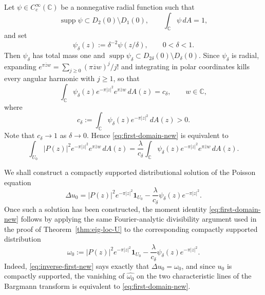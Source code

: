 \documentclass[a4paper,11pt,reqno]{amsart}
\numberwithin{equation}{section}
\theoremstyle{plain} %
\theoremstyle{definition} %
\theoremstyle{remark}
\DeclareMathOperator{\supp}{supp}
\newcommand{\C}{\mathbb{C}}
\begin{document}
Let $\psi\in C_c^\infty(\C)$ be a nonnegative radial function such that
\[
\supp \psi \subset D_2(0)\setminus D_1(0),
\qquad
\int_\C \psi\,dA=1,
\]
and set
\[
\psi_\delta(z):=\delta^{-2}\psi(z/\delta),\qquad 0<\delta<1.
\]
Then $\psi_\delta$ has total mass one and $\supp\psi_\delta\subset D_{2\delta}(0)\setminus D_\delta(0)$. Since $\psi_\delta$ is radial, expanding $e^{\pi\overline z w}=\sum_{j\ge 0}(\pi\overline z w)^j/j!$ and integrating in polar coordinates kills every angular harmonic with $j\ge 1$, so that
\[
\int_{\C} \psi_\delta(z)e^{-\pi|z|^2}e^{\pi \overline z w}\,dA(z)=c_\delta,
\qquad w\in\C,
\]
where
\[
c_\delta:=\int_{\C}\psi_\delta(z)e^{-\pi|z|^2}\,dA(z)>0.
\]
Note that $c_\delta\to 1$ as $\delta\to 0$. Hence \eqref{eq:first-domain-new} is equivalent to
\begin{equation}\label{eq:second-domain-new}
\int_{U_0} |P(z)|^2 e^{-\pi|z|^2} e^{\pi \overline z w}\,dA(z)
=
\frac{\lambda}{c_\delta}
\int_{\C}\psi_\delta(z)e^{-\pi|z|^2}e^{\pi \overline z w}\,dA(z).
\end{equation}

We shall construct a compactly supported distributional solution of the Poisson equation
\begin{equation}\label{eq:inverse-first-new}
\Delta u_0
=
|P(z)|^2 e^{-\pi|z|^2}\mathbf{1}_{U_0}
-\frac{\lambda}{c_\delta}\psi_\delta(z)e^{-\pi|z|^2}.
\end{equation}
Once such a solution has been constructed, the moment identity \eqref{eq:first-domain-new} follows by applying the same Fourier-analytic divisibility argument used in the proof of Theorem~\ref{thm:eig-loc-U} to the corresponding compactly supported distribution
\[
\omega_0:=
|P(z)|^2e^{-\pi|z|^2}\mathbf 1_{U_0}
-\frac{\lambda}{c_\delta}\psi_\delta(z)e^{-\pi|z|^2}.
\]
Indeed, \eqref{eq:inverse-first-new} says exactly that $\Delta u_0=\omega_0$, and since $u_0$ is compactly supported, the vanishing of $\widehat{\omega_0}$ on the two characteristic lines of the Bargmann transform is equivalent to \eqref{eq:first-domain-new}.
\end{document}
